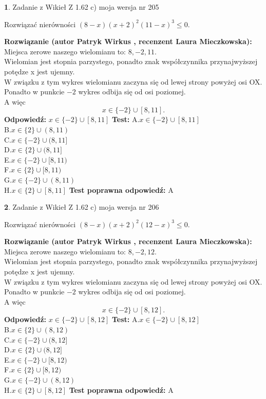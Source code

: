 \documentclass[12pt, a4paper]{article}
\theoremstyle{definition} %
\newtheorem{zad}{}
\newcommand{\zadStart}[1]{\begin{zad}#1\newline}
\newcommand{\zadStop}{\end{zad}}
\newcommand{\rozwStart}[2]{\noindent \textbf{Rozwiązanie (autor #1 , recenzent #2): }\newline}
\newcommand{\rozwStop}{\newline}
\newcommand{\odpStart}{\noindent \textbf{Odpowiedź:}\newline}
\newcommand{\odpStop}{\newline}
\newcommand{\testStart}{\noindent \textbf{Test:}\newline}
\newcommand{\testStop}{\newline}
\newcommand{\kluczStart}{\noindent \textbf{Test poprawna odpowiedź:}\newline}
\newcommand{\kluczStop}{\newline}
\begin{document}
\zadStart{Zadanie z Wikieł Z 1.62 c) moja wersja nr 205}

Rozwiązać nierówności $(8-x)(x+2)^{2}(11-x)^{3}\le0$.
\zadStop
\rozwStart{Patryk Wirkus}{Laura Mieczkowska}
Miejsca zerowe naszego wielomianu to: $8, -2, 11$.\\
Wielomian jest stopnia parzystego, ponadto znak współczynnika przy\linebreak najwyższej potędze x jest ujemny.\\ W związku z tym wykres wielomianu zaczyna się od lewej strony powyżej osi OX.\\
Ponadto w punkcie $-2$ wykres odbija się od osi poziomej.\\
A więc $$x \in \{-2\} \cup [8,11].$$
\rozwStop
\odpStart
$x \in \{-2\} \cup [8,11]$
\odpStop
\testStart
A.$x \in \{-2\} \cup [8,11]$\\
B.$x \in \{2\} \cup (8,11)$\\
C.$x \in \{-2\} \cup (8,11]$\\
D.$x \in \{2\} \cup (8,11]$\\
E.$x \in \{-2\} \cup [8,11)$\\
F.$x \in \{2\} \cup [8,11)$\\
G.$x \in \{-2\} \cup (8,11)$\\
H.$x \in \{2\} \cup [8,11]$
\testStop
\kluczStart
A
\kluczStop



\zadStart{Zadanie z Wikieł Z 1.62 c) moja wersja nr 206}

Rozwiązać nierówności $(8-x)(x+2)^{2}(12-x)^{3}\le0$.
\zadStop
\rozwStart{Patryk Wirkus}{Laura Mieczkowska}
Miejsca zerowe naszego wielomianu to: $8, -2, 12$.\\
Wielomian jest stopnia parzystego, ponadto znak współczynnika przy\linebreak najwyższej potędze x jest ujemny.\\ W związku z tym wykres wielomianu zaczyna się od lewej strony powyżej osi OX.\\
Ponadto w punkcie $-2$ wykres odbija się od osi poziomej.\\
A więc $$x \in \{-2\} \cup [8,12].$$
\rozwStop
\odpStart
$x \in \{-2\} \cup [8,12]$
\odpStop
\testStart
A.$x \in \{-2\} \cup [8,12]$\\
B.$x \in \{2\} \cup (8,12)$\\
C.$x \in \{-2\} \cup (8,12]$\\
D.$x \in \{2\} \cup (8,12]$\\
E.$x \in \{-2\} \cup [8,12)$\\
F.$x \in \{2\} \cup [8,12)$\\
G.$x \in \{-2\} \cup (8,12)$\\
H.$x \in \{2\} \cup [8,12]$
\testStop
\kluczStart
A
\kluczStop
\end{document}
